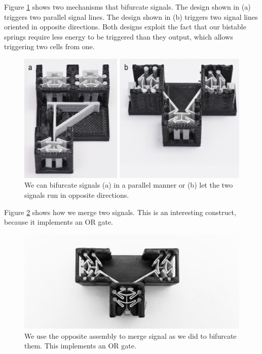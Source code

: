 Figure \ref{fig:11-signal-bifurcation} shows two mechanisms that bifurcate signals. The design shown in (a) triggers two parallel signal lines. The design shown in (b) triggers two signal lines oriented in opposite directions. Both designs exploit the fact that our bistable springs require less energy to be triggered than they output, which allows triggering two cells from one. 

\begin{figure} [h]  
    \includegraphics[width=\textwidth]{chapters/digital-metamaterials-FIG/11-signal-bifurcation.pdf}
    \caption[Short figure name.]{We can bifurcate signals (a) in a parallel manner or (b) let the two signals run in opposite directions. 
    \label{fig:11-signal-bifurcation}}
\end{figure}

Figure \ref{fig:12-signal-merging-OR} shows how we merge two signals. This is an interesting construct, because it implements an OR gate.

\begin{figure} [h]  
    \includegraphics[width=\textwidth]{chapters/digital-metamaterials-FIG/12-signal-merging-OR.jpg}
    \caption[Short figure name.]{We use the opposite assembly to merge signal as we did to bifurcate them. This implements an OR gate.
    \label{fig:12-signal-merging-OR}}
\end{figure}


